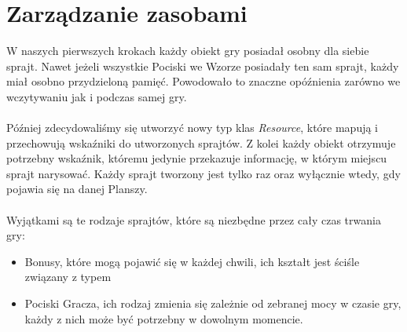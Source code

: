 \documentclass[a4paper,twoside]{article}
\begin{document}
		\section{Zarządzanie zasobami}
			W naszych pierwszych krokach każdy obiekt gry posiadał osobny dla siebie sprajt. Nawet jeżeli wszystkie Pociski we Wzorze posiadały ten sam sprajt, każdy miał osobno przydzieloną pamięć. Powodowało to znaczne opóźnienia zarówno we wczytywaniu jak i podczas samej gry.\\\\
			Później zdecydowaliśmy się utworzyć nowy typ klas \textit{Resource}, które mapują i przechowują wskaźniki do utworzonych sprajtów. Z kolei każdy obiekt otrzymuje potrzebny wskaźnik, któremu jedynie przekazuje informację, w którym miejscu sprajt narysować. Każdy sprajt tworzony jest tylko raz oraz wyłącznie wtedy, gdy pojawia się na danej Planszy.\\\\
			Wyjątkami są te rodzaje sprajtów, które są niezbędne przez cały czas trwania gry:
			\begin{itemize}
				\item Bonusy, które mogą pojawić się w każdej chwili, ich kształt jest ściśle związany z typem
				\item Pociski Gracza, ich rodzaj zmienia się zależnie od zebranej mocy w czasie gry, każdy z nich może być potrzebny w dowolnym momencie. 
			\end{itemize}
			
\end{document}
